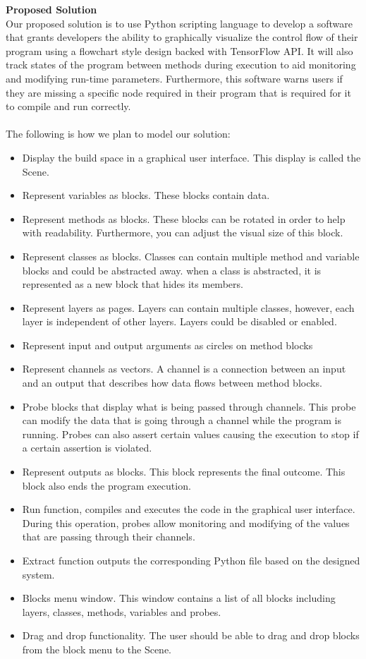 \documentclass[a4paper,10pt]{IEEETran} \usepackage[margin=1.0in]{geometry} \usepackage{pdfpages} \usepackage{graphicx}
\begin{document}
	\noindent \textbf{Proposed Solution}\\
	\indent Our proposed solution is to use Python scripting language to develop a software that grants developers the ability to graphically visualize the control flow of their program using a flowchart style design backed with TensorFlow API.
	 It will also track states of the program between methods during execution to aid monitoring and modifying run-time parameters.
	 Furthermore, this software warns users if they are missing a specific node required in their program that is required for it to compile and run correctly.\\
	 \\The following is how we plan to model our solution:
	\begin{itemize}
		\item Display the build space in a graphical user interface. This display is called the Scene.
		\item Represent variables as blocks. These blocks contain data.
		\item Represent methods as blocks. These blocks can be rotated in order to help with readability. Furthermore, you can adjust the visual size of this block.
		\item Represent classes as blocks. Classes can contain multiple method and variable blocks and could be abstracted away.
		 when a class is abstracted, it is represented as a new block that hides its members.
		\item Represent layers as pages. Layers can contain multiple classes, however, each layer is independent of other layers. Layers could be disabled or enabled.
		\item Represent input and output arguments as circles on method blocks
		\item Represent channels as vectors. A channel is a connection between an input and an output that describes how data flows between method blocks.
		\item Probe blocks that display what is being passed through channels.
		 This probe can modify the data that is going through a channel while the program is running.
		 Probes can also assert certain values causing the execution to stop if a certain assertion is violated.
		\item Represent outputs as blocks. This block represents the final outcome.
		 This block also ends the program execution.
		\item Run function, compiles and executes the code in the graphical user interface.
		 During this operation, probes allow monitoring and modifying of the values that are passing through their channels.
		\item Extract function outputs the corresponding Python file based on the designed system.
		\item Blocks menu window. This window contains a list of all blocks including layers, classes, methods, variables and probes.
		\item Drag and drop functionality. The user should be able to drag and drop blocks from the block menu to the Scene.
	\end{itemize}
\end{document}
